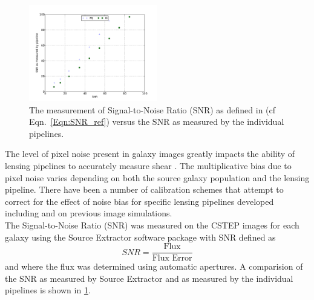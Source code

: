 \begin{figure}
 \centering  %
  \includegraphics[width=0.5\textwidth]{fig/SNR_mfix.pdf} 
  \caption{The measurement of Signal-to-Noise Ratio (SNR) as defined
    in (cf Eqn.~\ref{Eqn:SNR_ref}) versus the SNR as measured by the
    individual pipelines.}
\label{fig:Snr_comp}
\end{figure}

The level of pixel noise present in galaxy images
greatly impacts the ability of lensing pipelines 
to accurately measure shear \citep[e.g.][]{peter_n, Okura_n, R_n}. 
The multiplicative bias due to pixel noise varies 
depending on both the source galaxy population
and the lensing pipeline. There have been a number
of calibration schemes that attempt to correct for the
effect of noise bias for specific lensing pipelines developed
including \citep{K_n} and \citep{cfhtls} on previous image 
simulations.  \\
\indent The Signal-to-Noise Ratio (SNR) was measured on the CSTEP images
for each galaxy using the Source Extractor software package 
\citep{Sext} with SNR defined as  
\begin{equation}\label{Eqn:SNR_ref}
SNR = \frac{\textrm{Flux}}{\textrm{Flux Error}}
\end{equation}
and where the flux was determined using automatic apertures.  A
comparision of the SNR as measured by Source Extractor and as measured
by the individual pipelines is shown in \ref{fig:Snr_comp}. 

